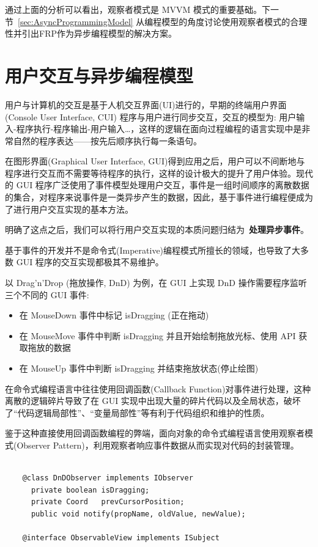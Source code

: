 通过上面的分析可以看出，观察者模式是 MVVM 模式的重要基础。下一节~\ref{sec:AsyncProgrammingModel} 从编程模型的角度讨论使用观察者模式的合理性并引出FRP作为异步编程模型的解决方案。

\section{用户交互与异步编程模型\label{sec:AsyncProgrammingModel}}

用户与计算机的交互是基于人机交互界面(UI)进行的，早期的终端用户界面 (Console User Interface, CUI) 程序与用户进行同步交互，交互的模型为: 用户输入-程序执行-程序输出-用户输入\ldots，这样的逻辑在面向过程编程的语言实现中是非常自然的程序表达——按先后顺序执行每一条语句。

在图形界面(Graphical User Interface, GUI)得到应用之后，用户可以不间断地与程序进行交互而不需要等待程序的执行，这样的设计极大的提升了用户体验。现代的 GUI 程序广泛使用了事件模型处理用户交互，事件是一组时间顺序的离散数据的集合，对程序来说事件是一类异步产生的数据，因此，基于事件进行编程便成为了进行用户交互实现的基本方法。

明确了这点之后，我们可以将行用户交互实现的本质问题归结为~\textbf{处理异步事件}。

基于事件的开发并不是命令式(Imperative)编程模式所擅长的领域，也导致了大多数 GUI 程序的交互实现都极其不易维护。

以 Drag'n'Drop (拖放操作, DnD) 为例\cite{Zhao2010}，在 GUI 上实现 DnD 操作需要程序监听三个不同的 GUI 事件:

\begin{itemize}
  \item 在 MouseDown 事件中标记 isDragging (正在拖动)
  \item 在 MouseMove 事件中判断 isDragging 并且开始绘制拖放光标、使用 API 获取拖放的数据
  \item 在 MouseUp 事件中判断 isDragging 并结束拖放状态(停止绘图)
\end{itemize}

在命令式编程语言中往往使用回调函数(Callback Function)对事件进行处理，这种离散的逻辑碎片导致了在 GUI 实现中出现大量的碎片代码以及全局状态，破坏了“代码逻辑局部性”、“变量局部性”等有利于代码组织和维护的性质。

鉴于这种直接使用回调函数编程的弊端，面向对象的命令式编程语言使用观察者模式(Observer Pattern)，利用观察者响应事件数据从而实现对代码的封装管理。

\begin{verbatim}

    @class DnDObserver implements IObserver
      private boolean isDragging;
      private Coord   prevCursorPosition;
      public void notify(propName, oldValue, newValue);

    @interface ObservableView implements ISubject

\end{verbatim}

